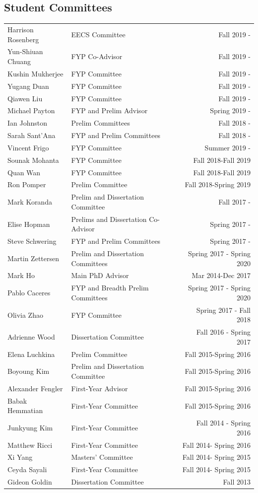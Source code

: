\documentclass[a4paper,10pt]{article}
\begin{document}
\subsection{Student Committees}
\vspace{-4mm}
\begin{longtabu} to \linewidth {XXr}
Harrison Rosenberg & EECS Committee & Fall 2019 - \\
Yun-Shiuan Chuang & FYP Co-Advisor & Fall 2019 - \\
Kushin Mukherjee & FYP Committee & Fall 2019 - \\
Yugang Duan & FYP Committee & Fall 2019 - \\
Qiawen Liu & FYP Committee & Fall 2019 - \\
Michael Payton & FYP and Prelim Advisor & Spring 2019 - \\
Ian Johnston & Prelim Committees & Fall 2018 - \\
Sarah Sant'Ana & FYP and Prelim Committees & Fall 2018 - \\
Vincent Frigo & FYP Committee & Summer 2019 - \\
Sounak Mohanta & FYP Committee & Fall 2018-Fall 2019 \\
Quan Wan & FYP Committee & Fall 2018-Fall 2019 \\
Ron Pomper & Prelim Committee & Fall 2018-Spring 2019 \\
Mark Koranda & Prelim and Dissertation Committee & Fall 2017 - \\
Elise Hopman & Prelims and Dissertation Co-Advisor & Spring 2017 - \\
Steve Schwering & FYP and Prelim Committees & Spring 2017 - \\
Martin Zettersen & Prelim and Dissertation Committees & Spring 2017 - Spring 2020 \\
Mark Ho & Main PhD Advisor & Mar 2014-Dec 2017 \\
Pablo Caceres & FYP and Breadth Prelim Committees & Spring 2017  - Spring 2020 \\
Olivia Zhao & FYP Committee & Spring 2017 - Fall 2018 \\
Adrienne Wood & Dissertation Committee & Fall 2016 - Spring 2017 \\
Elena Luchkina & Prelim Committee & Fall 2015-Spring 2016 \\
Boyoung Kim & Prelim and Dissertation Committee & Fall 2015-Spring 2016 \\
Alexander Fengler & First-Year Advisor & Fall 2015-Spring 2016 \\
Babak Hemmatian & First-Year Committee & Fall 2015-Spring 2016 \\
Junkyung Kim & First-Year Committee & Fall 2014 - Spring 2016 \\
Matthew Ricci & First-Year Committee & Fall 2014- Spring 2016 \\
Xi Yang & Masters' Committee & Fall 2014- Spring 2015 \\
Ceyda Sayali & First-Year Committee & Fall 2014- Spring 2015 \\
Gideon Goldin & Dissertation Committee & Fall 2013 \\
\end{longtabu}
\end{document}
